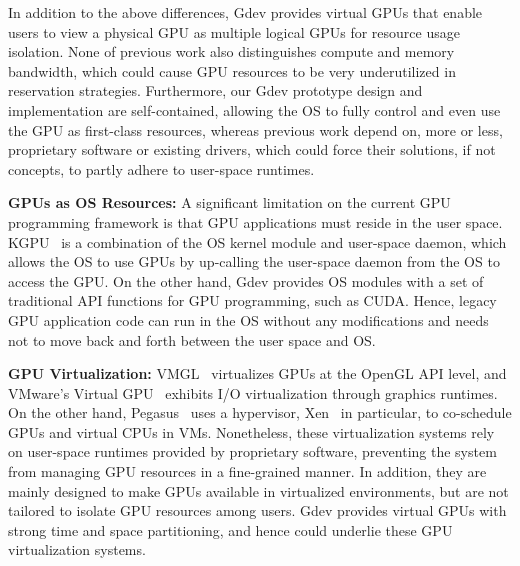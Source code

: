 In addition to the above differences, Gdev provides virtual GPUs that
enable users to view a physical GPU as multiple logical GPUs for
resource usage isolation.
None of previous work also distinguishes compute and memory bandwidth,
which could cause GPU resources to be very underutilized in
reservation strategies.
Furthermore, our Gdev prototype design and implementation are
self-contained, allowing the OS to fully control and even use the GPU as
first-class resources, whereas previous work depend on, more or less,
proprietary software or existing drivers, which could force their
solutions, if not concepts, to partly adhere to user-space runtimes.

\begin{comment}
Comparisons of Gdev and representatives of the above GPU resource
management approaches are summarized in Table~\ref{tab:related_work}.
\begin{table*}[t]
 \caption{Comparisons of Gdev and prior GPU resource management
 approaches.}
 \label{tab:related_work}
 \begin{center}
  {\sf
  \begin{tabular}{|l|p{12.8cm}|}
   \hline
   \hline
  \end{tabular}
  }
 \end{center}
\vspace{-1em}
\end{table*}
\end{comment}

\textbf{GPUs as OS Resources:}
A significant limitation on the current GPU programming framework is
that GPU applications must reside in the user space.
KGPU~\cite{Sun_SECURITY11_Poster} is a combination of the OS kernel
module and user-space daemon, which allows the OS to use GPUs by
up-calling the user-space daemon from the OS to access the GPU.
On the other hand, Gdev provides OS modules with a set of traditional
API functions for GPU programming, such as CUDA.
Hence, legacy GPU application code can run in the OS without any
modifications and needs not to move back and forth between the user
space and OS.

\textbf{GPU Virtualization:}
VMGL~\cite{Lagar-Cavilla_VEE07} virtualizes GPUs at the OpenGL
API level, and VMware's Virtual GPU~\cite{Dowty_SIGOPS09} exhibits I/O
virtualization through graphics runtimes.
On the other hand, Pegasus~\cite{Gupta_ATC11} uses a hypervisor,
Xen~\cite{Barham_SOSP03} in particular, to co-schedule GPUs and virtual
CPUs in VMs.
Nonetheless, these virtualization systems rely on user-space runtimes
provided by proprietary software, preventing the system from managing
GPU resources in a fine-grained manner. 
In addition, they are mainly designed to make GPUs available in
virtualized environments, but are not tailored to isolate GPU resources
among users.
Gdev provides virtual GPUs with strong time and space partitioning, and
hence could underlie these GPU virtualization systems.

